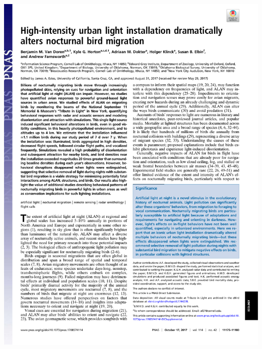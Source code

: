 \documentclass[a4paper, twoside]{templates/ociamthesis}
\begin{document}
\minitoc 

\newpage

\begin{center}\includegraphics[width=1\linewidth]{pdf_chapters/lights/lights_crop_Part1} \end{center}
\end{document}
